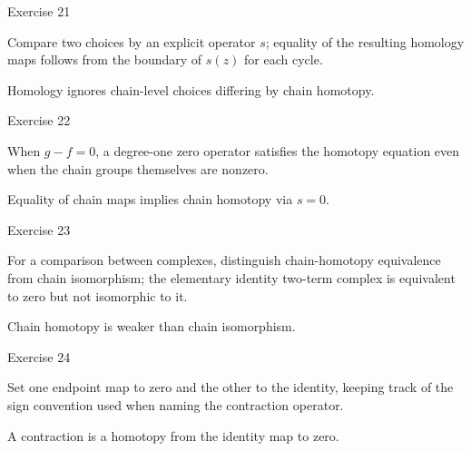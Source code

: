 \begin{exercise}\label{exr:viii22-21}
Exercise 21
\end{exercise}
\begin{hint}
Compare two choices by an explicit operator \(s\); equality of the resulting homology maps follows from the boundary of \(s(z)\) for each cycle.
\end{hint}
\begin{solution}
Homology ignores chain-level choices differing by chain homotopy.
\end{solution}

\begin{exercise}\label{exr:viii22-22}
Exercise 22
\end{exercise}
\begin{hint}
When \(g-f=0\), a degree-one zero operator satisfies the homotopy equation even when the chain groups themselves are nonzero.
\end{hint}
\begin{solution}
Equality of chain maps implies chain homotopy via \(s=0\).
\end{solution}

\begin{exercise}\label{exr:viii22-23}
Exercise 23
\end{exercise}
\begin{hint}
For a comparison between complexes, distinguish chain-homotopy equivalence from chain isomorphism; the elementary identity two-term complex is equivalent to zero but not isomorphic to it.
\end{hint}
\begin{solution}
Chain homotopy is weaker than chain isomorphism.
\end{solution}

\begin{exercise}\label{exr:viii22-24}
Exercise 24
\end{exercise}
\begin{hint}
Set one endpoint map to zero and the other to the identity, keeping track of the sign convention used when naming the contraction operator.
\end{hint}
\begin{solution}
A contraction is a homotopy from the identity map to zero.
\end{solution}


